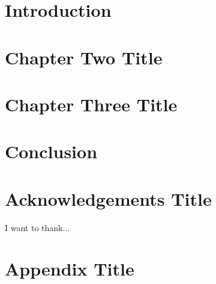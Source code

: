 \documentclass[12pt,twoside]{report}
\begin{document}

\thispagestyle{empty}




\tableofcontents
{}

\listoffigures
\thispagestyle{empty}

\listoftables
\thispagestyle{empty}

\linespread{1.5}

\clearpage
{}
\chapter{Introduction}


\chapter{Chapter Two Title}



\chapter{Chapter Three Title}


\chapter{Conclusion}


\nocite{*}

\clearpage
\printbibliography


\clearpage

\chapter*{Acknowledgements Title}
I want to thank...

\clearpage

\chapter*{Appendix Title}

\end{document}
